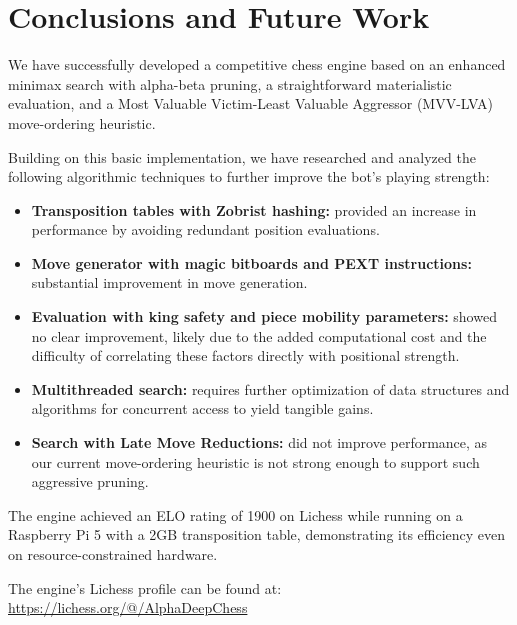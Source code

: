\chapter{Conclusions and Future Work}
\label{cap:conclusiones}

\noindent We have successfully developed a competitive chess engine based on an enhanced minimax search with alpha-beta pruning, a straightforward materialistic evaluation, and a Most Valuable Victim-Least Valuable Aggressor (MVV-LVA) move-ordering heuristic.

\vspace{1em}

Building on this basic implementation, we have researched and analyzed the following algorithmic techniques to further improve the bot's playing strength:

\begin{itemize}
    \item \textbf{Transposition tables with Zobrist hashing:} provided an increase in performance by avoiding redundant position evaluations.
    \item \textbf{Move generator with magic bitboards and PEXT instructions:} substantial improvement in move generation.
    
    \item \textbf{Evaluation with king safety and piece mobility parameters:} showed no clear improvement, likely due to the added computational cost and the difficulty of correlating these factors directly with positional strength.
    \item \textbf{Multithreaded search:} requires further optimization of data structures and algorithms for concurrent access to yield tangible gains.
    \item \textbf{Search with Late Move Reductions:} did not improve performance, as our current move-ordering heuristic is not strong enough to support such aggressive pruning.
\end{itemize}

\vspace{1em}

\noindent The engine achieved an ELO rating of 1900 on Lichess while running on a Raspberry Pi 5 with a 2GB transposition table, demonstrating its efficiency even on resource-constrained hardware.\\

\vspace{1em}

\noindent The engine's Lichess profile can be found at:\\
\url{https://lichess.org/@/AlphaDeepChess}


